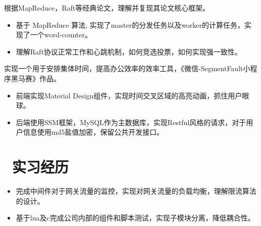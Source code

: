 \documentclass{resume}
\begin{document}
\vspace{-1.5ex}

\begin{onehalfspacing}
根据MapReduce，Raft等经典论文，理解并复现其论文核心框架。
\begin{itemize}
  \item 基于 MapReduce 算法, 实现了master的分发任务以及worker的计算任务，实现了一个word-counter。
  \item 理解Raft协议正常工作和心跳机制，如何竞选投票，如何实现强一致性。
\end{itemize}
\end{onehalfspacing}

\vspace{-1.5ex}

\begin{onehalfspacing}
实现一个用于安排集体时间，提高办公效率的效率工具，《微信-SegmentFault小程序黑马赛》作品。
\begin{itemize}
  \item 前端实现Material Design组件，实现时间交叉区域的高亮动画，抓住用户眼球。
  \item 后端使用SSM框架，MySQL作为主数据库，实现Restful风格的请求，对于用户信息使用md5盐值加密，保留公共开发接口。
\end{itemize}
\end{onehalfspacing}


\vspace{-1ex}

\section{\faSitemap\ 实习经历}
\vspace{-0.5ex}
\begin{onehalfspacing}
\begin{itemize}
  \item 完成中间件对于网关流量的监控，实现对网关流量的负载均衡，理解限流算法的设计。
  \item 基于lua及c完成公司内部的组件和脚本测试，实现子模块分离，降低耦合性。
\end{itemize}
\end{onehalfspacing}
\end{document}

